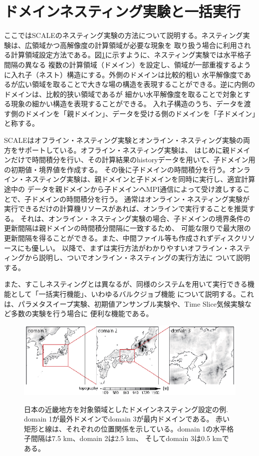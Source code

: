 \section{ドメインネスティング実験と一括実行}

ここではSCALEのネスティング実験の方法について説明する。ネスティング実験は、広領域かつ高解像度の計算領域が必要な現象を
取り扱う場合に利用される計算領域設定方法である。図\ref{fig_nestsample}に示すように、ネスティング実験では水平格子間隔の異なる
複数の計算領域（ドメイン）を設定し、領域が一部重複するように入れ子（ネスト）構造にする。外側のドメインは比較的粗い
水平解像度であるが広い領域を取ることで大きな場の構造を表現することができる。逆に内側のドメインは、比較的狭い領域であるが
細かい水平解像度を取ることで対象とする現象の細かい構造を表現することができる。
入れ子構造のうち、データを渡す側のドメインを「親ドメイン」、データを受ける側のドメインを「子ドメイン」と称する。

SCALEはオフライン・ネスティング実験とオンライン・ネスティング実験の両方をサポートしている。オフライン・ネスティング実験は、
はじめに親ドメインだけで時間積分を行い、その計算結果のhistoryデータを用いて、子ドメイン用の初期値・境界値を作成する。
その後に子ドメインの時間積分を行う。オンライン・ネスティング実験は、親ドメインと子ドメインを同時に実行し、適宜計算途中の
データを親ドメインから子ドメインへMPI通信によって受け渡しすることで、子ドメインの時間積分を行う。
通常はオンライン・ネスティング実験が実行できるだけの計算機リソースがあれば、オンラインで実行することを推奨する。
それは、オンライン・ネスティング実験の場合、子ドメインの境界条件の更新間隔は親ドメインの時間積分間隔に一致するため、
可能な限りで最大限の更新間隔を得ることができる。また、中間ファイル等も作成されずディスクリソースにも優しい。
以降で、まずは実行方法がわかりやすいオフライン・ネスティングから説明し、ついでオンライン・ネスティングの実行方法に
ついて説明する。

また、すこしネスティングとは異なるが、同様のシステムを用いて実行できる機能として「一括実行機能」、いわゆるバルクジョブ機能
について説明する。これは、パラメタスイープ実験、初期値アンサンブル実験や、Time Slice気候実験など多数の実験を行う場合に
便利な機能である。


\begin{figure}[t]
\begin{center}
  \includegraphics[width=1.0\hsize]{./figure/nesting_sample.eps}\\
  \caption{日本の近畿地方を対象領域としたドメインネスティング設定の例. domain 1が最外ドメインでdomain 3が最内ドメインである。
           赤い矩形と線は、それぞれの位置関係を示している。domain 1の水平格子間隔は7.5 km、domain 2は2.5 km、
           そしてdomain 3は0.5 kmである。}
  \label{fig_nestsample}
\end{center}
\end{figure}

